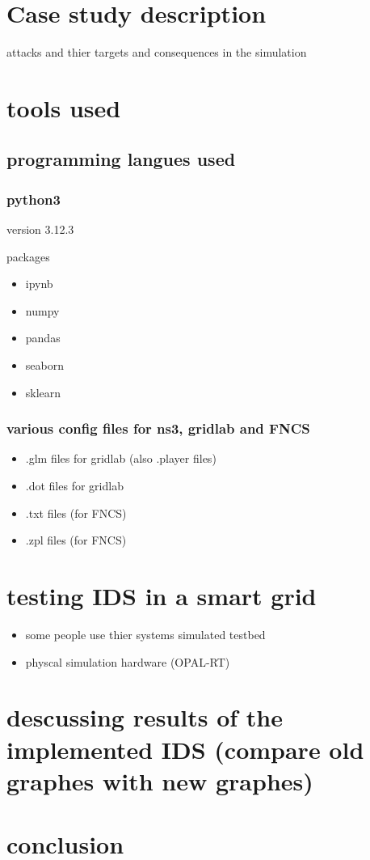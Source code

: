 \section{Case study description}
attacks and thier targets and consequences in the simulation



\section{tools used}
\subsection{programming langues used}
\subsubsection{python3}
version 3.12.3 

packages
\begin{itemize}
	\item ipynb
	\item numpy
	\item pandas
	\item seaborn
	\item sklearn
\end{itemize}


\subsubsection{various config files for ns3, gridlab and FNCS}
\begin{itemize}
	\item .glm files for gridlab (also .player files)
	\item .dot files for gridlab
	\item .txt files (for FNCS) 
	\item .zpl files (for FNCS) 
\end{itemize}



\section{testing IDS in a smart grid}

\begin{itemize}
	\item some people use thier systems simulated testbed
	\item physcal simulation hardware (OPAL-RT)
\end{itemize}



\section{descussing results of the implemented IDS (compare old graphes with new graphes)}


\section{conclusion}

